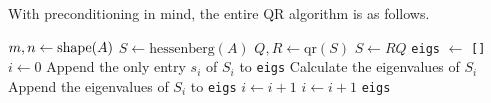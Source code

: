 With preconditioning in mind, the entire QR algorithm is as follows.

\begin{algorithm}[H] %
\begin{algorithmic}[1]
    \State $m, n \gets \mathrm{shape}(A)$
    \State $S \gets \text{hessenberg}(A)$ \label{step:qr-alg-hessenberg}
     \label{step:qr-alg-niters}
        \State $Q, R \gets \text{qr}(S)$ \label{step:qr-alg-qr-S}
        \State $S \gets RQ$
    \EndFor
    \State \texttt{eigs} $\gets$ \texttt{[]}
    \State $i \gets 0$
         \label{step:qr-alg-S_i-1x1-or-2x2}
            \State Append the only entry $s_i$ of $S_i$ to \texttt{eigs}
            \State Calculate the eigenvalues of $S_i$
                \label{step:qr-alg-S_i-eigs}
            \State Append the eigenvalues of $S_i$ to \texttt{eigs}
            \State $i \gets i + 1$
        \EndIf
        \State $i \gets i + 1$
    \EndWhile
    \State {} \texttt{eigs}
\EndProcedure
\end{algorithmic}
\caption{}
\label{Alg:qr-algorithm}
\end{algorithm}

